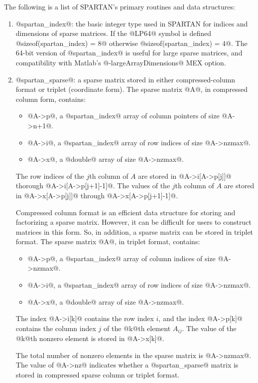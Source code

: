 \documentclass[10pt]{article}
\newcommand{\solverf}{\sffamily}
\newcommand{\matlab}{{\sc Matlab}}
\newcommand{\spartan}{{\solverf SPARTAN}}
\begin{document}
The following is a list of \spartan's primary routines and data structures:
\begin{enumerate}
\item @spartan_index@: the basic integer type used in \spartan{} for
indices and dimensions of sparse matrices. If the @LP64@ symbol is 
defined @sizeof(spartan_index) = 8@ otherwise @sizeof(spartan_index) = 4@. 
The 64-bit version of @spartan_index@ is useful for large sparse matrices,
and compatibility with \matlab's @-largeArrayDimensions@ MEX option. 

\item @spartan_sparse@: a sparse matrix stored in either compressed-column
format or triplet (coordinate form).  The sparse matrix @A@, in compressed 
column form, contains:
\begin{itemize}
\item @A->p@, a @spartan_index@ array of column pointers of size
  @A->n+1@.
\item @A->i@, a @spartan_index@ array of row  indices of size @A->nzmax@.
\item @A->x@, a @double@ array of size @A->nzmax@. 
\end{itemize}
The row indices of the $j$th column of $A$ are stored in 
@A->i[A->p[j]]@ thorough @A->i[A->p[j+1]-1]@. The values of the 
$j$th column of $A$ are stored in @A->x[A->p[j]]@ through 
@A->x[A->p[j+1]-1]@.

Compressed column format is an efficient data structure for storing
and factorizing a sparse matrix. However, it can be difficult for 
users to construct matrices in this form. So, in addition, a sparse 
matrix can be stored in triplet format. The sparse matrix @A@, in 
triplet format, contains:
\begin{itemize}
\item @A->p@, a @spartan_index@ array of column indices of size
  @A->nzmax@.
\item @A->i@, a @spartan_index@ array of row  indices of size @A->nzmax@.
\item @A->x@, a @double@ array of size @A->nzmax@. 
\end{itemize}
The index @A->i[k]@ contains the row index $i$, and the index  
@A->p[k]@ contains the column index $j$ of the @k@th element $A_{ij}$. 
The value of the @k@th nonzero element is stored in @A->x[k]@. 

The total number of nonzero elements in the sparse matrix is
@A->nzmax@. The value of @A->nz@ indicates whether a @spartan_sparse@
matrix is stored in compressed sparse column or triplet format.


\end{enumerate}
\end{document}
